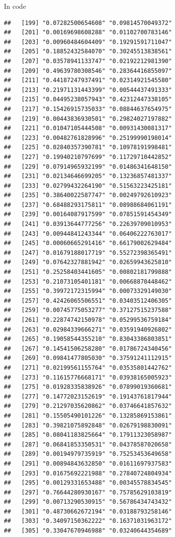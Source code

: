 \documentclass[ignorenonframetext,]{beamer}
\begin{document}
\begin{frame}[fragile]{In code}
\begin{verbatim}
##   [199] "0.07282500654608" "0.09814570049372"
##   [201] "0.00169698608288" "0.01102700783146"
##   [203] "0.00960484604409" "0.19291591711047"
##   [205] "0.18852432584070" "0.30245513838561"
##   [207] "0.03578941133747" "0.02192212981390"
##   [209] "0.49639780308546" "0.28364416855097"
##   [211] "0.44187247937491" "0.02314921545580"
##   [213] "0.21971131443399" "0.00544437491333"
##   [215] "0.04495238057943" "0.42312447338105"
##   [217] "0.15426915735033" "0.08844637654975"
##   [219] "0.00443836930501" "0.29824027197882"
##   [221] "0.01047105444508" "0.00931430081317"
##   [223] "0.00482761828996" "0.25199990198014"
##   [225] "0.02840357390781" "0.10978191998481"
##   [227] "0.19940210797699" "0.11729710442852"
##   [229] "0.07914965932199" "0.01486341648150"
##   [231] "0.02134646699205" "0.13236857481337"
##   [233] "0.02799432264190" "0.51563223425181"
##   [235] "0.38640022587747" "0.00249792610923"
##   [237] "0.68488293175811" "0.08988684061191"
##   [239] "0.00164087917599" "0.07851591454349"
##   [241] "0.03913644777256" "0.22639709010953"
##   [243] "0.00944841243344" "0.06406222763017"
##   [245] "0.00060665291416" "0.66179002629484"
##   [247] "0.01679188017719" "0.55272398365491"
##   [249] "0.07642327881942" "0.02659943625810"
##   [251] "0.25258403441605" "0.00802181799888"
##   [253] "0.21073105401181" "0.00668870448462"
##   [255] "0.39972172315994" "0.00073329149030"
##   [257] "0.42426065506551" "0.03403512406305"
##   [259] "0.00745775053277" "0.37127515237588"
##   [261] "0.22874742150978" "0.05299536759184"
##   [263] "0.02984339666271" "0.03591940926802"
##   [265] "0.19058544355210" "0.83043386803851"
##   [267] "0.14541506258280" "0.01786724340456"
##   [269] "0.09841477805030" "0.37591241112915"
##   [271] "0.02199561155764" "0.03535801442762"
##   [273] "0.11615776668171" "0.03938165005923"
##   [275] "0.01928335838926" "0.07899019360681"
##   [277] "0.14772023152619" "0.19143761817944"
##   [279] "0.21297035620862" "0.03746641857632"
##   [281] "0.15505490101226" "0.13285869153861"
##   [283] "0.39821075892848" "0.02679198830091"
##   [285] "0.08041183825664" "0.17911323058987"
##   [287] "0.06841853350531" "0.04378587020658"
##   [289] "0.00194979735919" "0.75253453649658"
##   [291] "0.00894843632850" "0.01611697937583"
##   [293] "0.01675692221988" "0.27840724804934"
##   [295] "0.00129331653488" "0.00345578834545"
##   [297] "0.76644280930167" "0.75785629103819"
##   [299] "0.00713290530915" "0.56786434743432"
##   [301] "0.48730662672194" "0.03188793258146"
##   [303] "0.34097150362222" "0.16371031963172"
##   [305] "0.33047670946988" "0.03240644354689"

\end{verbatim}
\end{frame}
\end{document}

